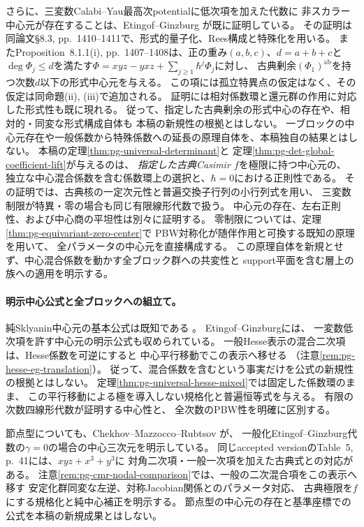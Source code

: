 さらに、三変数Calabi--Yau最高次potentialに低次項を加えた代数に
非スカラー中心元が存在することは、Etingof--Ginzburg
\cite[Theorem~3.3.2(ii), p.~1385]{EG}が既に証明している。
その証明は同論文\S8.3, pp.~1410--1411で、形式的量子化、Rees構成と特殊化を用いる。
またProposition~8.1.1(i), pp.~1407--1408は、正の重み$(a,b,c)$、$d=a+b+c$と
$\deg\Phi_j\le d$を満たす$\Phi=xyz-yxz+\sum_{j\ge1}\hbar^j\Phi_j$に対し、
古典剰余$(\Phi_1)^{\mathrm{ab}}$を持つ次数$d$以下の形式中心元を与える。
この項には孤立特異点の仮定はなく、その仮定は同命題(ii), (iii)で追加される。
証明には相対係数環と還元群の作用に対応した形式性も既に現れる。
従って、指定した古典剰余の形式中心の存在や、相対的・同変な形式構成自体も
本稿の新規性の根拠とはしない。
一ブロックの中心元存在や一般係数から特殊係数への延長の原理自体を、本稿独自の結果とはしない。
本稿の定理\ref{thm:pg-universal-determinant}と
定理\ref{thm:pg-det-global-coefficient-lift}が与えるのは、
\emph{指定した古典Casimir $f$}を極限に持つ中心元の、
独立な中心混合係数を含む係数環上の選択と、$\hbar=0$における正則性である。
その証明では、古典核の一定次元性と普遍交換子行列の小行列式を用い、
三変数制限が特異・零の場合も同じ有限線形代数で扱う。
中心元の存在、左右正則性、および中心商の平坦性は別々に証明する。
零制限については、定理\ref{thm:pg-equivariant-zero-center}で
PBW対称化が随伴作用と可換する既知の原理
\cite[Corollaries~13.7--13.8, p.~75]{PEtingofLie}を用いて、
全パラメータの中心元を直接構成する。
この原理自体を新規とせず、中心混合係数を動かす全ブロック群への共変性と
support平面を含む層上の族への適用を明示する。

\paragraph{明示中心公式と全ブロックへの組立て。}
純Sklyanin中心元の基本公式は既知である
\cite{SmithTate,DeLaetLeBruyn}。
Etingof--Ginzburg\cite[\S9, p.~1414]{EG}には、
一変数低次項を許す中心元の明示公式も収められている。
一般Hesse表示の混合二次項は、Hesse係数を可逆にすると
中心平行移動でこの表示へ移せる
（注意\ref{rem:pg-hesse-eg-translation}）。
従って、混合係数を含むという事実だけを公式の新規性の根拠とはしない。
定理\ref{thm:pg-universal-hesse-mixed}では固定した係数環のまま、
この平行移動による極を導入しない規格化と普遍恒等式を与える。
有限の次数四線形代数が証明する中心性と、
全次数のPBW性を明確に区別する。

節点型についても、Chekhov--Mazzocco--Rubtsov
\cite[Lemma~4.6, 式(4.39), p.~22]{PCMR}が、
一般化Etingof--Ginzburg代数の$\gamma=0$の場合の中心三次元を明示している。
同じaccepted versionのTable~5, p.~41には、$xyz+x^3+y^3$に
対角二次項・一般一次項を加えた古典式との対応がある。
注意\ref{rem:pg-cmr-nodal-comparison}では、一般の二次混合項をこの表示へ移す
安定化群同変な左逆、対称Jacobian関係とのパラメータ対応、
古典極限を$f$にする規格化と純中心補正を明示する。
節点型の中心元の存在と基準座標での公式を本稿の新規成果とはしない。

